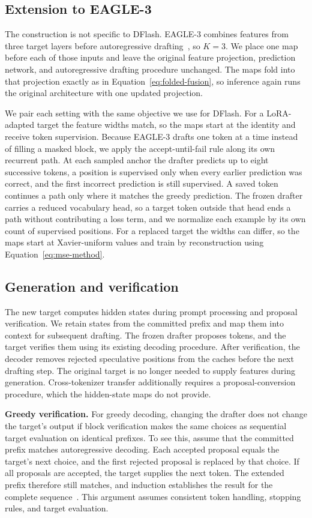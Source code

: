 \subsection{Extension to EAGLE-3}
\label{sec:method-eagle}
The construction is not specific to DFlash. EAGLE-3 combines features from three target layers before autoregressive drafting~\citep{li2025eagle3}, so $K=3$. We place one map before each of those inputs and leave the original feature projection, prediction network, and autoregressive drafting procedure unchanged. The maps fold into that projection exactly as in Equation~\ref{eq:folded-fusion}, so inference again runs the original architecture with one updated projection.

We pair each setting with the same objective we use for DFlash. For a LoRA-adapted target the feature widths match, so the maps start at the identity and receive token supervision. Because EAGLE-3 drafts one token at a time instead of filling a masked block, we apply the accept-until-fail rule along its own recurrent path. At each sampled anchor the drafter predicts up to eight successive tokens, a position is supervised only when every earlier prediction was correct, and the first incorrect prediction is still supervised. A saved token continues a path only where it matches the greedy prediction. The frozen drafter carries a reduced vocabulary head, so a target token outside that head ends a path without contributing a loss term, and we normalize each example by its own count of supervised positions. For a replaced target the widths can differ, so the maps start at Xavier-uniform values and train by reconstruction using Equation~\ref{eq:mse-method}.

\subsection{Generation and verification}
\label{sec:method-generation}
The new target computes hidden states during prompt processing and proposal verification. We retain states from the committed prefix and map them into context for subsequent drafting. The frozen drafter proposes tokens, and the target verifies them using its existing decoding procedure. After verification, the decoder removes rejected speculative positions from the caches before the next drafting step. The original target is no longer needed to supply features during generation. Cross-tokenizer transfer additionally requires a proposal-conversion procedure, which the hidden-state maps do not provide.

\textbf{Greedy verification.} For greedy decoding, changing the drafter does not change the target's output if block verification makes the same choices as sequential target evaluation on identical prefixes. To see this, assume that the committed prefix matches autoregressive decoding. Each accepted proposal equals the target's next choice, and the first rejected proposal is replaced by that choice. If all proposals are accepted, the target supplies the next token. The extended prefix therefore still matches, and induction establishes the result for the complete sequence~\citep{leviathan2023speculative,chen2023sampling}. This argument assumes consistent token handling, stopping rules, and target evaluation.
